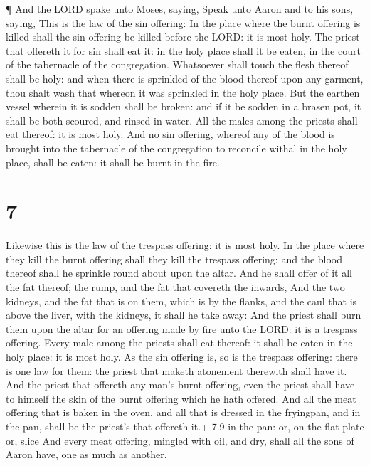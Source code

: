 ¶ And the LORD spake unto Moses, saying, 
Speak unto Aaron and to his sons, saying, This is the law of the sin
offering: In the place where the burnt offering is killed shall the sin
offering be killed before the LORD: it is most holy.  The
priest that offereth it for sin shall eat it: in the holy place shall it
be eaten, in the court of the tabernacle of the congregation.
 Whatsoever shall touch the flesh thereof shall be holy:
and when there is sprinkled of the blood thereof upon any garment, thou
shalt wash that whereon it was sprinkled in the holy place.
 But the earthen vessel wherein it is sodden shall be
broken: and if it be sodden in a brasen pot, it shall be both scoured,
and rinsed in water.  All the males among the priests shall
eat thereof: it is most holy.  And no sin offering, whereof
any of the blood is brought into the tabernacle of the congregation to
reconcile withal in the holy place, shall be eaten: it shall be burnt in
the fire.

\hypertarget{section-6}{%
\section{7}\label{section-6}}

 Likewise this is the law of the trespass offering: it is
most holy.  In the place where they kill the burnt offering
shall they kill the trespass offering: and the blood thereof shall he
sprinkle round about upon the altar.  And he shall offer of
it all the fat thereof; the rump, and the fat that covereth the inwards,
 And the two kidneys, and the fat that is on them, which is
by the flanks, and the caul that is above the liver, with the kidneys,
it shall he take away:  And the priest shall burn them upon
the altar for an offering made by fire unto the LORD: it is a trespass
offering.  Every male among the priests shall eat thereof:
it shall be eaten in the holy place: it is most holy.  As
the sin offering is, so is the trespass offering: there is one law for
them: the priest that maketh atonement therewith shall have it.
 And the priest that offereth any man's burnt offering, even
the priest shall have to himself the skin of the burnt offering which he
hath offered.  And all the meat offering that is baken in
the oven, and all that is dressed in the fryingpan, and in the pan,
shall be the priest's that offereth it.+ 7.9 in the pan: or, on the flat
plate or, slice  And every meat offering, mingled with oil,
and dry, shall all the sons of Aaron have, one as much as another.

